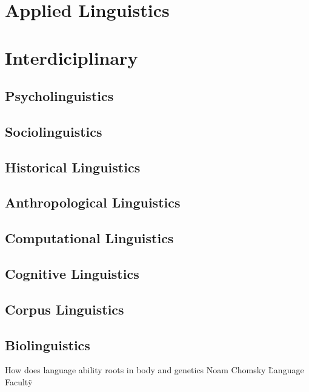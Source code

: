 \documentclass[a4paper]{article}
\begin{document}
    
    \section{Applied Linguistics}
    
    
    \section{Interdiciplinary}
        
        \subsection{Psycholinguistics}
        
        \subsection{Sociolinguistics}
        
        \subsection{Historical Linguistics}
        
        \subsection{Anthropological Linguistics}
        
        \subsection{Computational Linguistics}
        
        \subsection{Cognitive Linguistics}
        
        \subsection{Corpus Linguistics}
        
        \subsection{Biolinguistics}
            How does language ability roots in body and genetics
            Noam Chomsky \"Language Faculty\"
        
\end{document}
